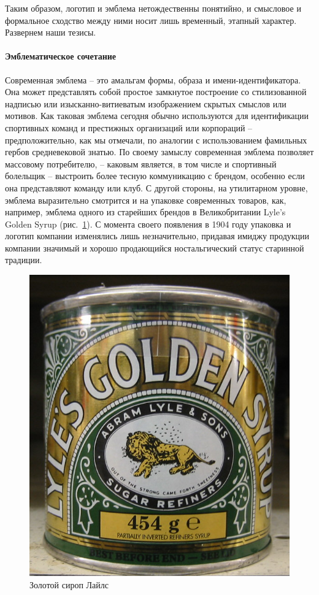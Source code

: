 Таким образом, логотип и эмблема нетождественны понятийно, и смысловое и формальное сходство между
ними носит лишь временный, этапный характер.  Развернем наши тезисы.

\paragraph{Эмблематическое сочетание}
Современная эмблема – это амальгам формы, образа и имени\hyp{}идентификатора. Она может представлять
собой простое замкнутое построение со стилизованной надписью или изысканно-витиеватым изображением
скрытых смыслов или мотивов. Как таковая эмблема сегодня обычно используются для идентификации
спортивных команд и престижных организаций или корпораций – предположительно, как мы отмечали,  по
аналогии с использованием фамильных гербов средневековой знатью. По своему замыслу современная
эмблема позволяет  массовому потребителю, -- каковым является, в том числе и спортивный болельщик
-- выстроить более тесную коммуникацию с брендом, особенно если она представляют команду или клуб.
С другой стороны, на утилитарном уровне, эмблема выразительно смотрится и на упаковке современных
товаров, как, например, эмблема одного из старейших брендов в Великобритании Lyle’s Golden
Syrup (рис.~\ref{fig:syrop}). С момента своего появления в 1904 году упаковка и логотип компании изменялись
лишь незначительно, придавая имиджу продукции компании значимый и хорошо продающийся ностальгический
статус старинной традиции.

\begin{figure}[h!]
  \centering
  \includegraphics[width=.3\linewidth]{images/goldensyrop}
  \caption{Золотой сироп Лайлс}
  \label{fig:syrop}
\end{figure}

